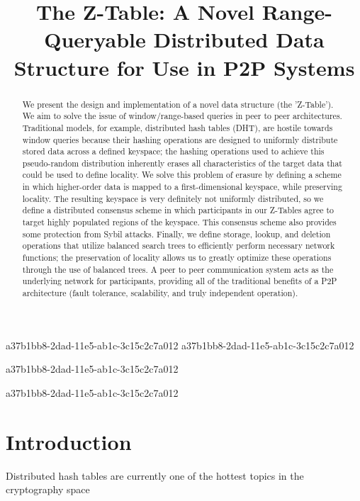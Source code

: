 \documentclass[12pt]{article}
\title{The Z-Table: A Novel Range-Queryable Distributed Data Structure for Use in P2P Systems}
\begin{document}
a37b1bb8-2dad-11e5-ab1c-3c15c2c7a012
a37b1bb8-2dad-11e5-ab1c-3c15c2c7a012\maketitle

\begin{abstract}
We present the design and implementation of a novel data structure (the 'Z-Table'). We aim to solve the issue of window/range-based queries in peer to peer architectures. Traditional models, for example,  distributed hash tables (DHT), are hostile towards window queries because their hashing operations are designed to uniformly distribute stored data across a defined keyspace; the hashing operations used to achieve this pseudo-random distribution inherently erases all characteristics of the target data that could be used to define locality. We solve this problem of erasure by defining a scheme in which higher-order data is mapped to a first-dimensional keyspace, while preserving locality. The resulting keyspace is very definitely not uniformly distributed, so we define a distributed consensus scheme in which participants in our Z-Tables agree to target highly populated regions of the keyspace. This consensus scheme also provides some protection from Sybil attacks. Finally, we define storage, lookup, and deletion operations that utilize balanced search trees to efficiently perform necessary network functions; the preservation of locality allows us to greatly optimize these operations through the use of balanced trees. A peer to peer communication system acts as the underlying network for participants, providing all of the traditional benefits of a P2P architecture (fault tolerance, scalability, and truly independent operation).
\end{abstract}
a37b1bb8-2dad-11e5-ab1c-3c15c2c7a012

\newpage
a37b1bb8-2dad-11e5-ab1c-3c15c2c7a012\section{Introduction}
Distributed hash tables are currently one of the hottest topics in the cryptography space~\cite{Stoica:2001dj,Rowstron:2001ea,Ratnasamy:2001wn}

\printbibliography
\end{document}
